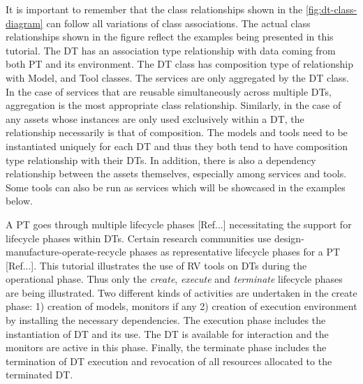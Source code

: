 It is important to remember that the class relationships shown in the \cref{fig:dt-class-diagram} can follow all variations of class associations. The actual class relationships shown in the figure reflect the examples being presented in this tutorial. The DT has an association type relationship with data coming from both PT and its environment. The DT class has composition type of relationship with Model, and Tool classes. The services are only aggregated by the DT class. In the case of services that are reusable simultaneously across multiple DTs, aggregation is the most appropriate class relationship. Similarly, in the case of any assets whose instances are only used exclusively within a DT, the relationship necessarily is that of composition. The models and tools need to be instantiated uniquely for each DT and thus they both tend to have composition type relationship with their DTs.
In addition, there is also a dependency relationship between the assets themselves, especially among services and tools. Some tools can also be run as services which will be showcased in the examples below.

A PT goes through multiple lifecycle phases [Ref...] necessitating the support for lifecycle phases within DTs. Certain research communities use design-manufacture-operate-recycle phases as representative lifecycle phases for a PT [Ref...]. This tutorial illustrates the use of RV tools on DTs during the operational phase. Thus only the \emph{create}, \emph{execute} and \emph{terminate} lifecycle phases are being illustrated. Two different kinds of activities are undertaken in the create phase: 1) creation of models, monitors if any 2) creation of execution environment by installing the necessary dependencies.
The execution phase includes the instantiation of DT and its use. The DT is available for interaction and the monitors are active in this phase. Finally, the terminate phase includes the termination of DT execution and revocation of all resources allocated to the terminated DT.


